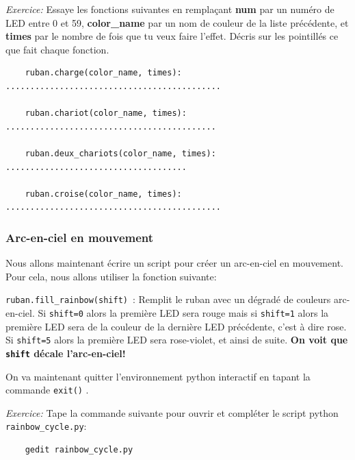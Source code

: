 \textit{Exercice:} Essaye les fonctions suivantes en remplaçant \textbf{num} par un numéro de LED entre 0 et 59,
\vspace{1em}
\textbf{color\_name} par un nom de couleur de la liste précédente, et \textbf{times} par le nombre de fois
que tu veux faire l'effet.
Décris sur les pointillés ce que fait chaque fonction.

\color{blue}
\begin{verbatim}
    ruban.charge(color_name, times): ............................................

    ruban.chariot(color_name, times): ...........................................

    ruban.deux_chariots(color_name, times): .....................................

    ruban.croise(color_name, times): ............................................
\end{verbatim}
\color{black}

\subsubsection{Arc-en-ciel en mouvement}
\label{sec:arc_en_ciel}

Nous allons maintenant écrire un script pour créer un arc-en-ciel en mouvement. Pour cela, nous allons utiliser
la fonction suivante:
\vspace{1em}

\color{blue}\texttt{ruban.fill\_rainbow(shift)}\ : \color{black} Remplit le ruban avec un dégradé de couleurs arc-en-ciel. Si \texttt{shift=0} alors la première LED sera rouge
mais si \texttt{shift=1} alors la première LED sera de la couleur de la dernière LED précédente, c'est à dire rose.
Si \texttt{shift=5} alors la première LED sera rose-violet, et ainsi de suite. \textbf{On voit que \texttt{shift} décale
l'arc-en-ciel!}\par

\vspace{1em}

On va maintenant quitter l'environnement python interactif en tapant la commande \color{blue}
\texttt{exit()} \color{black}.

\textit{Exercice:} Tape la commande suivante pour ouvrir et compléter le script python \texttt{rainbow\_cycle.py}:

\color{blue}
\begin{verbatim}
    gedit rainbow_cycle.py
\end{verbatim}
\color{black}

